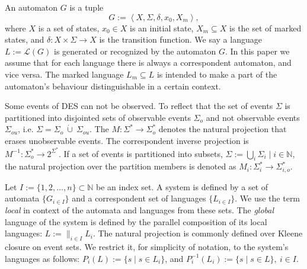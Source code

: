 \documentclass[a4paper, 10pt, conference]{ieeeconf}
\begin{document}
An automaton $G$ is a tuple $$G := \left< X,\Sigma,\delta,x_0, X_m \right>,$$
where $X$ is a set of states, $x_0 \in X$ is an initial state, $X_m \subseteq X$
is the set of marked states, and $\delta: X \times \Sigma \rightarrow X$ is the
transition function.
We say a language $L := \mathcal{L}(G)$ is generated or recognized by the
automaton $G$. In this paper we assume that for each language there is always a
correspondent automaton, and vice versa. The marked language $L_m \subseteq L$
is intended to make a part of the automaton's behaviour distinguishable in a
certain context.

Some events of DES can not be observed. To reflect that the set of events
$\Sigma$ is partitioned into disjointed sets of observable events $\Sigma_o$ and
not observable events $\Sigma_{ou}$, i.e. $\Sigma = \Sigma_o~\dot{\cup}~
\Sigma_{ou}$.
The $M: \Sigma^* \rightarrow \Sigma_o^*$ denotes the natural projection that
erases unobservable events.
The correspondent inverse projection is $M^{-1}: \Sigma_o^* \rightarrow
2^{\Sigma^*}$.
If a set of events is partitioned into subsets, $\Sigma := \bigcup_i
\Sigma_{i} \mid i \in \mathbb{N}$, the natural projection over the partition
members is denoted as $M_i: \Sigma_i^* \rightarrow \Sigma_{i,o}^*$.

Let $I := \{1,2,\ldots,n\} \subset  \mathbb{N}$ be an index set. A system is
defined by a set of automata $\{G_{i \in I}\}$ and a correspondent set of
languages $\{L_{i \in I}\}$. We use the term \emph{local} in context of the
automata and languages from these sets. The \emph{global} language of the system
is defined by the parallel composition \cite{cassandras_introduction_2010} of
its local languages:
$L := \parallel_{i \in I} L_i$.
The natural projection is commonly defined over Kleene closure on event sets.
We restrict it, for simplicity of notation, to the system's languages as
follows: $P_i(L) := \{s\mid s\in L_{i}\}$, and $P_i^{-1}(L_{i}) := \{s \mid s
\in L\}, ~i \in I$.
\end{document}

